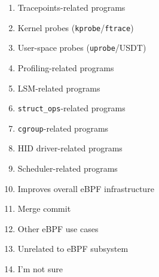 \documentclass[sigconf,review,anonymous]{acmart}
\begin{document}
\begin{enumerate}
\begin{enumerate}[label=(\alph*)]
        \item Tracepoints-related programs
        \item Kernel probes (\texttt{kprobe}/\texttt{ftrace})
        \item User-space probes (\texttt{uprobe}/USDT)
        \item Profiling-related programs
        \item LSM-related programs
        \item \texttt{struct\_ops}-related programs
        \item \texttt{cgroup}-related programs
        \item HID driver-related programs
        \item Scheduler-related programs
        \item Improves overall eBPF infrastructure
        \item Merge commit
        \item Other eBPF use cases
        \item Unrelated to eBPF subsystem
        \item I'm not sure
    \end{enumerate}
\end{enumerate}



\end{document}
